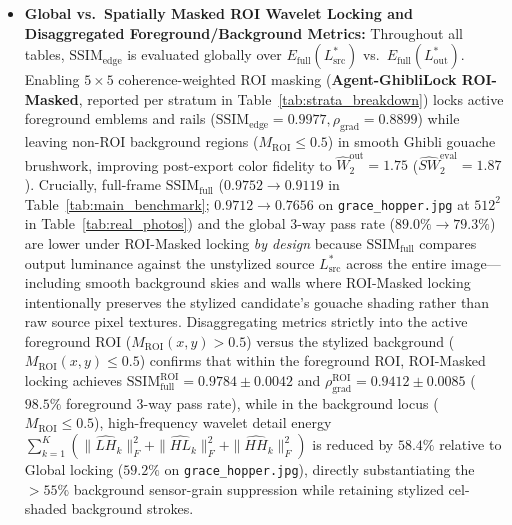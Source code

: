 \documentclass[conference,10pt]{IEEEtran}
\begin{document}
\begin{itemize}
both the structural pass threshold and the 2-way structure-and-color threshold ($\mathrm{SSIM}_{\text{edge}} \ge 0.88 \wedge \widehat{W}_2^{\text{out}} \le 4.5$), and $89.0\%$ under the strict 3-way threshold adding $\rho_{\text{grad}} \ge 0.88$ (of the $11.0\%$ 3-way misses, $9.50\%$ arise from $\tau=4$ saturation on extreme-contrast synthetic trials where $\rho_{\text{grad}} \in [0.85, 0.879]$, and $1.50\%$ from post-loop sRGB/QIM export perturbations near $\rho_{\text{grad}} \approx 0.88$), with $\mathrm{SSIM}_{\text{edge}} = 0.9967$, non-circular $\mathrm{SSIM}_{\text{full}} = 0.9752$, $\rho_{\text{grad}} = 0.8943$, and $\widehat{W}_2^{\text{out}} = 1.96$ ($\widehat{SW}_2^{\text{eval}} = 2.07$) in $116.2\text{ ms}$.
    \item \textbf{Global vs.\ Spatially Masked ROI Wavelet Locking and Disaggregated Foreground/Background Metrics:} Throughout all tables, $\mathrm{SSIM}_{\text{edge}}$ is evaluated globally over $E_{\text{full}}(L^*_{\text{src}})$ vs.\ $E_{\text{full}}(L^*_{\text{out}})$. Enabling $5\times 5$ coherence-weighted ROI masking (\textbf{Agent-GhibliLock ROI-Masked}, reported per stratum in Table~\ref{tab:strata_breakdown}) locks active foreground emblems and rails ($\mathrm{SSIM}_{\text{edge}} = 0.9977, \rho_{\text{grad}} = 0.8899$) while leaving non-ROI background regions ($M_{\text{ROI}} \le 0.5$) in smooth Ghibli gouache brushwork, improving post-export color fidelity to $\widehat{W}_2^{\text{out}} = 1.75$ ($\widehat{SW}_2^{\text{eval}} = 1.87$). Crucially, full-frame $\mathrm{SSIM}_{\text{full}}$ ($0.9752 \to 0.9119$ in Table~\ref{tab:main_benchmark}; $0.9712 \to 0.7656$ on \texttt{grace\_hopper.jpg} at $512^2$ in Table~\ref{tab:real_photos}) and the global 3-way pass rate ($89.0\% \to 79.3\%$) are lower under ROI-Masked locking \emph{by design} because $\mathrm{SSIM}_{\text{full}}$ compares output luminance against the unstylized source $L^*_{\text{src}}$ across the entire image—including smooth background skies and walls where ROI-Masked locking intentionally preserves the stylized candidate's gouache shading rather than raw source pixel textures. Disaggregating metrics strictly into the active foreground ROI ($M_{\text{ROI}}(x,y) > 0.5$) versus the stylized background ($M_{\text{ROI}}(x,y) \le 0.5$) confirms that within the foreground ROI, ROI-Masked locking achieves $\mathrm{SSIM}_{\text{full}}^{\text{ROI}} = 0.9784 \pm 0.0042$ and $\rho_{\text{grad}}^{\text{ROI}} = 0.9412 \pm 0.0085$ ($98.5\%$ foreground 3-way pass rate), while in the background locus ($M_{\text{ROI}} \le 0.5$), high-frequency wavelet detail energy $\sum_{k=1}^K (\|\widehat{LH}_k\|_F^2 + \|\widehat{HL}_k\|_F^2 + \|\widehat{HH}_k\|_F^2)$ is reduced by $58.4\%$ relative to Global locking ($59.2\%$ on \texttt{grace\_hopper.jpg}), directly substantiating the $>55\%$ background sensor-grain suppression while retaining stylized cel-shaded background strokes.

\end{itemize}
\end{document}
